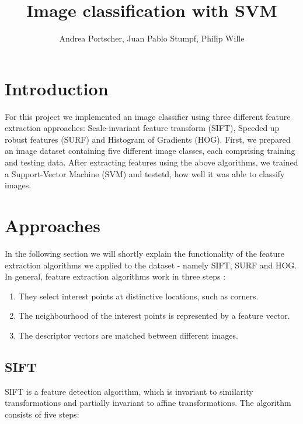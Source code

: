 \documentclass{scrartcl}
\title{Image classification with SVM}
\author{Andrea Portscher, Juan Pablo Stumpf, Philip Wille}
\begin{document}
\maketitle

\section{Introduction}
For this project we implemented an image classifier using three different feature extraction approaches: Scale-invariant feature transform (SIFT), Speeded up robust features (SURF) and Histogram of Gradients (HOG). First, we prepared an image dataset containing five different image classes, each comprising training and testing data. After extracting features using the above algorithms, we trained a Support-Vector Machine (SVM) and testetd, how well it was able to classify images.
\section{Approaches}
In the following section we will shortly explain the functionality of the feature extraction algorithms we applied to the dataset - namely SIFT, SURF and HOG.
In general, feature extraction algorithms work in three steps \cite{bay2006}:
\begin{enumerate}
  \item They select interest points at distinctive locations, such as corners.
  \item The neighbourhood of the interest points is represented by a feature vector.
  \item The descriptor vectors are matched between different images.
\end{enumerate}

\subsection{SIFT}
SIFT is a feature detection algorithm, which is invariant to similarity transformations and partially invariant to affine transformations. The algorithm consists of five steps:
\end{document}
